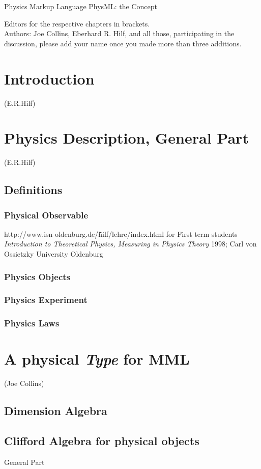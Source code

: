 \documentclass[12pt]{article}
\begin{document}
\centerline{\Large Physics Markup Language PhysML: the Concept} 
Editors for the respective chapters in brackets.
\\

Authors: Joe Collins, Eberhard R. Hilf, and all those, participating in the
discussion, please add your name once you made more than three additions.
\tableofcontents
\newpage 
\section{Introduction}
(E.R.Hilf)

\section{Physics Description, General Part}
(E.R.Hilf)
\subsection{Definitions}
\subsubsection{Physical Observable}
http://www.isn-oldenburg.de/\~hilf/lehre/index.html
for First term students
\textit{Introduction to Theoretical Physics, Measuring in Physics Theory
} 1998; Carl von Ossietzky University Oldenburg
\\


\subsubsection{Physics Objects}
\subsubsection{Physics Experiment}
\subsubsection{Physics Laws}
\section{A physical \textit{Type} for MML}
(Joe Collins)
\subsection{Dimension Algebra}
\subsection{Clifford Algebra for physical objects}
General Part
\end{document}
